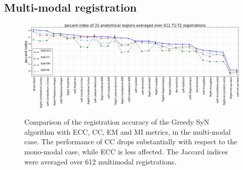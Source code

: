 \subsection{Multi-modal registration}\label{sec:multimodal_results}
\begin{figure}[t!]
\centering
\includegraphics[width=0.95\linewidth]{./images/multi_lines_seg.png}\\
\caption{{\small Comparison of the registration accuracy of the Greedy SyN algorithm with ECC, CC, EM and MI metrics, in the multi-modal case. The performance of CC drops substantially with respect to the mono-modal case, while ECC is less affected. The Jaccard indices were averaged over 612 multimodal registrations.}}
\label{fig:multi_seg}\figcloser
\end{figure}
